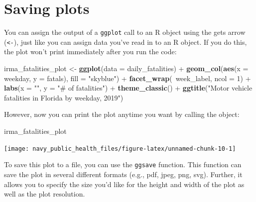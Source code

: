 \documentclass[]{tufte-book}
\newenvironment{Shaded}{}{}
\newcommand{\DataTypeTok}[1]{\textcolor[rgb]{0.56,0.13,0.00}{#1}}
\newcommand{\DecValTok}[1]{\textcolor[rgb]{0.25,0.63,0.44}{#1}}
\newcommand{\KeywordTok}[1]{\textcolor[rgb]{0.00,0.44,0.13}{\textbf{#1}}}
\newcommand{\NormalTok}[1]{#1}
\newcommand{\OperatorTok}[1]{\textcolor[rgb]{0.40,0.40,0.40}{#1}}
\newcommand{\StringTok}[1]{\textcolor[rgb]{0.25,0.44,0.63}{#1}}
\begin{document}
\hypertarget{saving-plots}{%
\section{Saving plots}\label{saving-plots}}

You can assign the output of a \texttt{ggplot} call to an R object using the gets arrow
(\texttt{\textless{}-}), just like you can assign data you've read in to an R object. If you do this,
the plot won't print immediately after you run the code:

\begin{Shaded}
\begin{Highlighting}[]
\NormalTok{irma_fatalities_plot <-}\StringTok{ }\KeywordTok{ggplot}\NormalTok{(}\DataTypeTok{data =}\NormalTok{ daily_fatalities) }\OperatorTok{+}\StringTok{ }
\StringTok{    }\KeywordTok{geom_col}\NormalTok{(}\KeywordTok{aes}\NormalTok{(}\DataTypeTok{x =}\NormalTok{ weekday, }\DataTypeTok{y =}\NormalTok{ fatals), }\DataTypeTok{fill =} \StringTok{"skyblue"}\NormalTok{) }\OperatorTok{+}\StringTok{ }
\StringTok{    }\KeywordTok{facet_wrap}\NormalTok{(}\OperatorTok{~}\NormalTok{week_label, }\DataTypeTok{ncol =} \DecValTok{1}\NormalTok{) }\OperatorTok{+}\StringTok{ }\KeywordTok{labs}\NormalTok{(}\DataTypeTok{x =} \StringTok{""}\NormalTok{, }
    \DataTypeTok{y =} \StringTok{"# of fatalities"}\NormalTok{) }\OperatorTok{+}\StringTok{ }\KeywordTok{theme_classic}\NormalTok{() }\OperatorTok{+}\StringTok{ }
\StringTok{    }\KeywordTok{ggtitle}\NormalTok{(}\StringTok{"Motor vehicle fatalities in Florida by weekday, 2019"}\NormalTok{)}
\end{Highlighting}
\end{Shaded}

However, now you can print the plot anytime you want by calling the object:

\begin{Shaded}
\begin{Highlighting}[]
\NormalTok{irma_fatalities_plot}
\end{Highlighting}
\end{Shaded}

\texttt{[image: navy\_public\_health\_files/figure-latex/unnamed-chunk-10-1]}

To save this plot to a file, you can use the \texttt{ggsave} function. This function can save
the plot in several different formats (e.g., pdf, jpeg, png, svg). Further, it allows you
to specify the size you'd like for the height and width of the plot as well as the plot
resolution.
\end{document}
